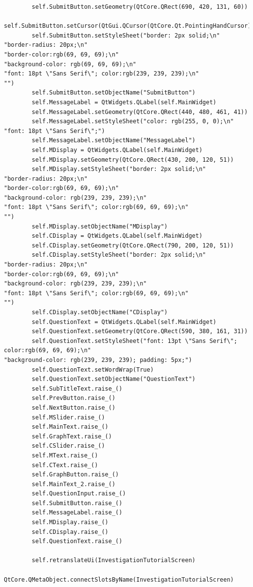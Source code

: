 \documentclass{article}
\begin{document}
\begin{lstlisting}
        self.SubmitButton.setGeometry(QtCore.QRect(690, 420, 131, 60))
        self.SubmitButton.setCursor(QtGui.QCursor(QtCore.Qt.PointingHandCursor))
        self.SubmitButton.setStyleSheet("border: 2px solid;\n"
"border-radius: 20px;\n"
"border-color:rgb(69, 69, 69);\n"
"background-color: rgb(69, 69, 69);\n"
"font: 18pt \"Sans Serif\"; color:rgb(239, 239, 239);\n"
"")
        self.SubmitButton.setObjectName("SubmitButton")
        self.MessageLabel = QtWidgets.QLabel(self.MainWidget)
        self.MessageLabel.setGeometry(QtCore.QRect(440, 480, 461, 41))
        self.MessageLabel.setStyleSheet("color: rgb(255, 0, 0);\n"
"font: 18pt \"Sans Serif\";")
        self.MessageLabel.setObjectName("MessageLabel")
        self.MDisplay = QtWidgets.QLabel(self.MainWidget)
        self.MDisplay.setGeometry(QtCore.QRect(430, 200, 120, 51))
        self.MDisplay.setStyleSheet("border: 2px solid;\n"
"border-radius: 20px;\n"
"border-color:rgb(69, 69, 69);\n"
"background-color: rgb(239, 239, 239);\n"
"font: 18pt \"Sans Serif\"; color:rgb(69, 69, 69);\n"
"")
        self.MDisplay.setObjectName("MDisplay")
        self.CDisplay = QtWidgets.QLabel(self.MainWidget)
        self.CDisplay.setGeometry(QtCore.QRect(790, 200, 120, 51))
        self.CDisplay.setStyleSheet("border: 2px solid;\n"
"border-radius: 20px;\n"
"border-color:rgb(69, 69, 69);\n"
"background-color: rgb(239, 239, 239);\n"
"font: 18pt \"Sans Serif\"; color:rgb(69, 69, 69);\n"
"")
        self.CDisplay.setObjectName("CDisplay")
        self.QuestionText = QtWidgets.QLabel(self.MainWidget)
        self.QuestionText.setGeometry(QtCore.QRect(590, 380, 161, 31))
        self.QuestionText.setStyleSheet("font: 13pt \"Sans Serif\"; color:rgb(69, 69, 69);\n"
"background-color: rgb(239, 239, 239); padding: 5px;")
        self.QuestionText.setWordWrap(True)
        self.QuestionText.setObjectName("QuestionText")
        self.SubTitleText.raise_()
        self.PrevButton.raise_()
        self.NextButton.raise_()
        self.MSlider.raise_()
        self.MainText.raise_()
        self.GraphText.raise_()
        self.CSlider.raise_()
        self.MText.raise_()
        self.CText.raise_()
        self.GraphButton.raise_()
        self.MainText_2.raise_()
        self.QuestionInput.raise_()
        self.SubmitButton.raise_()
        self.MessageLabel.raise_()
        self.MDisplay.raise_()
        self.CDisplay.raise_()
        self.QuestionText.raise_()

        self.retranslateUi(InvestigationTutorialScreen)
        QtCore.QMetaObject.connectSlotsByName(InvestigationTutorialScreen)


\end{lstlisting}
\end{document}
